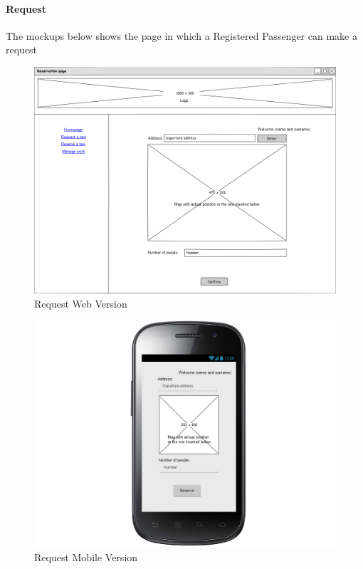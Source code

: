 \documentclass[a4paper,12pt]{article}%
\begin{document}
\paragraph{Request}
The mockups below shows the page in which a Registered Passenger can make a request
\begin{figure}[H]
\centering
\includegraphics[scale=0.35]{mockups/request_web.png}
\caption{Request Web Version}
\end{figure}
\begin{figure}[H]
\centering
\includegraphics[scale=0.35]{mockups/request_mobile.png}
\caption{Request Mobile Version}
\end{figure}
\break
\end{document}
